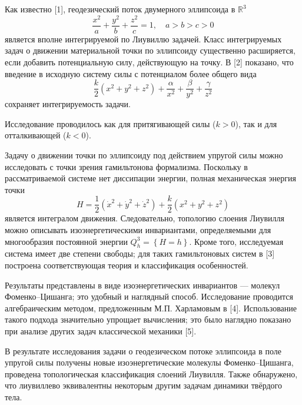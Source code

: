 


\vzmscaption


Как известно [1], геодезический поток двумерного эллипсоида в $\mathbb{R}^3$
$$
\frac{x^2}{a}+\frac{y^2}{b}+\frac{z^2}{c}=1,\quad a>b>c>0
$$
является вполне интегрируемой по Лиувиллю задачей. Класс интегрируемых задач о движении материальной точки по эллипсоиду существенно расширяется, если добавить потенциальную силу, действующую на точку. В [2] показано, что введение в исходную систему силы с потенциалом более общего вида
$$
\frac{k}{2}\left( x^2+y^2+z^2\right)+\frac{\alpha}{x^2}+\frac{\beta}{y^2}+\frac{\gamma}{z^2}
$$
сохраняет интегрируемость задачи.

Исследование проводилось как для притягивающей силы
\linebreak
($k>0$), так и для отталкивающей ($k<0$).


Задачу о движении точки по эллипсоиду под действием упругой силы можно исследовать с точки зрения гамильтонова формализма. Поскольку в рассматриваемой системе нет диссипации энергии, полная механическая энергия точки
$$
H=\frac{1}{2}\left(\dot x^2+\dot y^2+\dot z^2\right)+\frac{k}{2}\left(x^2+y^2+z^2\right)
$$
является интегралом движения. Следовательно, топологию слоения Лиувилля можно описывать изоэнергетическими инвариантами, определяемыми для многообразия постоянной энергии $Q^3_h=\left\{H=h \right\}$. Кроме того, исследуемая система имеет две степени свободы; для таких гамильтоновых систем в [3] построена соответствующая теория и  классификация особенностей.


Результаты представлены в виде изоэнергетических инвариантов --- молекул Фоменко--Цишанга;
это удобный и наглядный способ.
Исследование проводится алгебраическим методом,
\linebreak
предложенным М.П. Харламовым в [4].
Использование такого подхода значительно упрощает вычисления;
это было наглядно показано при анализе других задач классической механики [5].

В результате исследования задачи о геодезическом потоке эллипсоида в поле упругой силы получены новые изоэнергетические молекулы Фоменко--Цишанга, проведена топологическая классификация слоений Лиувилля. Также обнаружено, что лиувиллево эквивалентны некоторым другим задачам динамики твёрдого тела.


